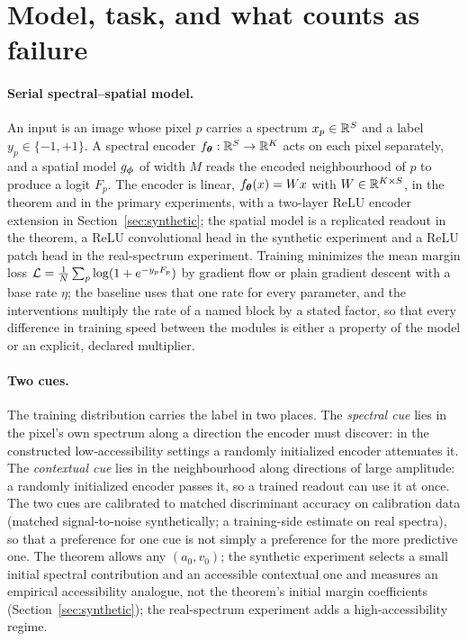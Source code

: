 \section{Model, task, and what counts as failure}
\label{sec:model}

\paragraph{Serial spectral--spatial model.}
An input is an image whose pixel $p$ carries a spectrum $x_p\in\mathbb{R}^S$ and a
label $y_p\in\{-1,+1\}$. A spectral encoder $f_{\boldsymbol{\theta}}:\mathbb{R}^S\to\mathbb{R}^K$ acts on
each pixel separately, and a spatial model $g_{\boldsymbol{\phi}}$ of width $M$ reads the
encoded neighbourhood of $p$ to produce a logit $F_p$. The encoder is
linear, $f_{\boldsymbol{\theta}}(x)=Wx$ with $W\in\mathbb{R}^{K\times S}$, in the theorem and in
the primary experiments, with a two-layer ReLU encoder extension in
Section~\ref{sec:synthetic}; the spatial model is a replicated readout in
the theorem, a ReLU convolutional head in the synthetic experiment and a
ReLU patch head in the real-spectrum experiment. Training minimizes the
mean margin loss $\mathcal{L}=\frac1N\sum_p\log(1+e^{-y_pF_p})$ by gradient flow
or plain gradient descent with a base rate $\eta$; the baseline uses that
one rate for every parameter, and the interventions multiply the rate of
a named block by a stated factor, so that every difference in training
speed between the modules is either a property of the model or an
explicit, declared multiplier.

\paragraph{Two cues.}
The training distribution carries the label in two places. The
\emph{spectral cue} lies in the pixel's own spectrum along a direction the
encoder must discover: in the constructed low-accessibility settings a
randomly initialized encoder attenuates it. The
\emph{contextual cue} lies in the neighbourhood along directions of large
amplitude: a randomly initialized encoder passes it, so a trained readout
can use it at once. The two cues are calibrated to matched discriminant
accuracy on calibration data (matched signal-to-noise synthetically; a
training-side estimate on real spectra), so that a
preference for one cue is not simply a preference for the more predictive
one. The theorem allows any $(a_0,v_0)$; the synthetic experiment selects
a small initial spectral contribution and an accessible contextual one
and measures an empirical accessibility analogue, not the theorem's
initial margin coefficients (Section~\ref{sec:synthetic}); the
real-spectrum experiment adds a high-accessibility regime.

